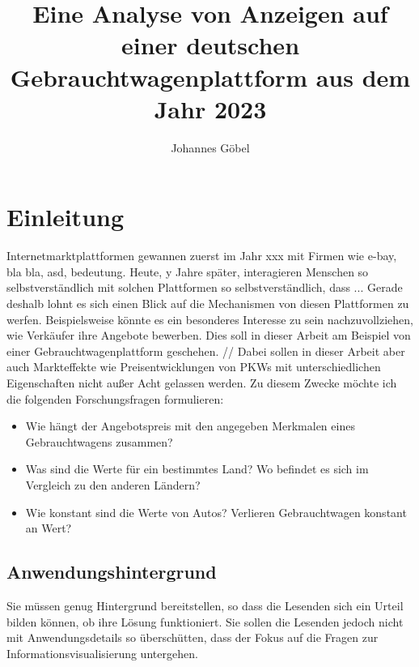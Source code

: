 \documentclass[usegeometry=true]{scrartcl}
\begin{document}
\subject{Projektbericht zum Modul Information Retrieval und Visualisierung Sommersemester 2022}
\title{Eine Analyse von Anzeigen auf einer deutschen Gebrauchtwagenplattform aus dem Jahr 2023}
\author{Johannes Göbel}%
\maketitle%

\section{Einleitung}

Internetmarktplattformen gewannen zuerst im Jahr xxx mit Firmen wie e-bay, bla bla, asd, bedeutung. Heute, y Jahre später, interagieren Menschen so selbstverständlich mit solchen Plattformen so selbstverständlich, dass ...
Gerade deshalb lohnt es sich einen Blick auf die Mechanismen von diesen Plattformen zu werfen. Beispielsweise könnte es ein besonderes Interesse zu sein nachzuvollziehen, wie Verkäufer ihre Angebote bewerben.
Dies soll in dieser Arbeit am Beispiel von einer Gebrauchtwagenplattform geschehen. //
Dabei sollen in dieser Arbeit aber auch Markteffekte wie Preisentwicklungen von PKWs mit unterschiedlichen Eigenschaften nicht außer Acht gelassen werden. Zu diesem Zwecke möchte ich die folgenden Forschungsfragen formulieren:

\begin{itemize}
    \item Wie hängt der Angebotspreis mit den angegeben Merkmalen eines Gebrauchtwagens zusammen?
    \item Was sind die Werte für ein bestimmtes Land? Wo befindet es sich im Vergleich zu den anderen Ländern? 
    \item Wie konstant sind die Werte von Autos? Verlieren Gebrauchtwagen konstant an Wert?
\end{itemize}

\subsection{Anwendungshintergrund}
Sie müssen genug Hintergrund bereitstellen, so dass die Lesenden sich ein Urteil bilden können, ob ihre Lösung funktioniert. Sie sollen die Lesenden jedoch nicht mit Anwendungsdetails so überschütten, dass der Fokus auf die Fragen zur Informationsvisualisierung untergehen. 
\end{document}

